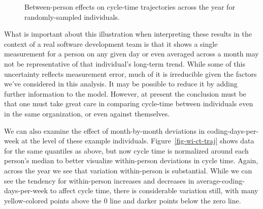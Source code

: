 \documentclass[manuscript,screen,review]{acmart}
\begin{document}
\begin{figure}


\caption[Between-person effects on cycle-time
trajectories]{\label{fig-bw-ct-traj}Between-person effects on cycle-time
trajectories across the year for randomly-sampled individuals.}

\end{figure}%

What is important about this illustration when interpreting these
results in the context of a real software development team is that it
shows a single measurement for a person on any given day or even
averaged across a month may not be representative of that individual's
long-term trend. While some of this uncertainty reflects measurement
error, much of it is irreducible given the factors we've considered in
this analysis. It may be possible to reduce it by adding further
information to the model. However, at present the conclusion must be
that one must take great care in comparing cycle-time between
individuals even in the same organization, or even against themselves.

We can also examine the effect of month-by-month deviations in
coding-days-per-week at the level of these example individuals.
Figure~\ref{fig-wi-ct-traj} shows data for the same quantiles as above,
but now cycle time is normalized around each person's median to better
visualize within-person deviations in cycle time. Again, across the year
we see that variation within-person is substantial. While we can see the
tendency for within-person increases and decreases in
average-coding-days-per-week to affect cycle time, there is considerable
variation still, with many yellow-colored points above the 0 line and
darker points below the zero line.
\end{document}
